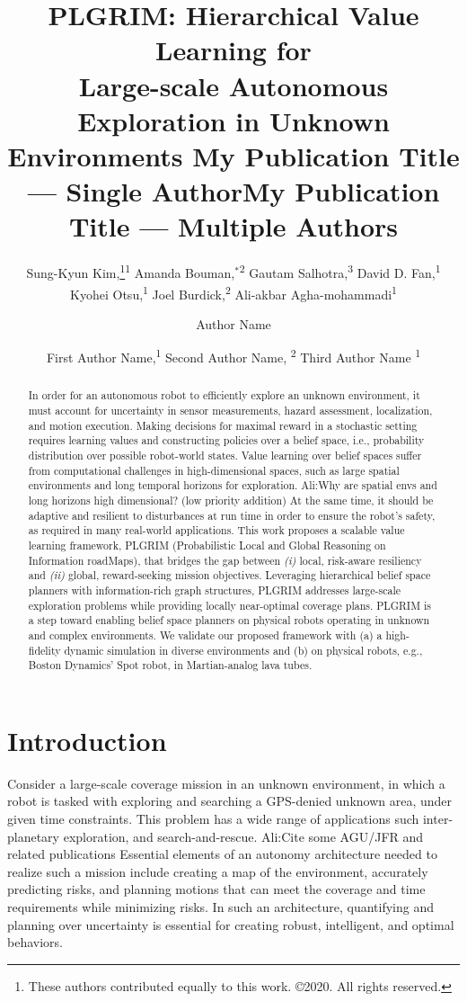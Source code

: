 \documentclass[letterpaper]{article} %
\title{
    PLGRIM: Hierarchical Value Learning for \\Large-scale Autonomous Exploration in Unknown Environments
}
\author{
		Sung-Kyun Kim,\thanks{These authors contributed equally to this work. \newline \hspace*{1.1em} \copyright2020. All rights reserved.}\textsuperscript{\rm 1}
    Amanda Bouman,$^{*}$\textsuperscript{\rm 2}
    Gautam Salhotra,\textsuperscript{\rm 3}
    David D. Fan,\textsuperscript{\rm 1} \\
    Kyohei Otsu,\textsuperscript{\rm 1}
    Joel Burdick,\textsuperscript{\rm 2}
    Ali-akbar Agha-mohammadi\textsuperscript{\rm 1} \\
}
\title{My Publication Title --- Single Author}
\author {
    Author Name \\
}
\title{My Publication Title --- Multiple Authors}
\author {
    First Author Name,\textsuperscript{\rm 1}
    Second Author Name, \textsuperscript{\rm 2}
    Third Author Name \textsuperscript{\rm 1} \\
}
\newcommand{\phdone}[1]{} %
\newcommand{\acomm}[1]{{\color{cyan}Ali:#1}} %
\begin{document}
\maketitle

\begin{abstract}
In order for an autonomous robot to efficiently explore an unknown environment, it must account for uncertainty in sensor measurements, hazard assessment, localization, and motion execution.
Making decisions for maximal reward in a stochastic setting requires learning values and constructing policies over a belief space, i.e., probability distribution over possible robot-world states.
Value learning over belief spaces suffer from computational challenges in high-dimensional spaces, such as large spatial environments and long temporal horizons for exploration. \acomm{Why are spatial envs and long horizons high dimensional? (low priority addition)}
At the same time, it should be adaptive and resilient to disturbances at run time in order to ensure the robot's safety, as required in many real-world applications.
This work proposes a scalable value learning framework, PLGRIM (Probabilistic Local and Global Reasoning on Information roadMaps), that bridges the gap between \textit{(i)} local, risk-aware resiliency and \textit{(ii)} global, reward-seeking mission objectives.  
Leveraging hierarchical belief space planners with information-rich graph structures, PLGRIM addresses large-scale exploration problems while providing locally near-optimal coverage plans. 
PLGRIM is a step toward enabling belief space planners on physical robots operating in unknown and complex environments. 
We validate our proposed framework with (a) a high-fidelity dynamic simulation in diverse environments and (b) on physical robots, e.g., Boston Dynamics' Spot robot, in Martian-analog lava tubes.
\end{abstract}


\section{Introduction}\label{sec:intro}

\phdone{High-level mission}
Consider a large-scale coverage mission in an unknown environment, in which a robot is tasked with exploring and searching a GPS-denied unknown area, under given time constraints. This problem has a wide range of applications such inter-planetary exploration, and search-and-rescue. \acomm{Cite some AGU/JFR and related publications} 
Essential elements of an autonomy architecture needed to realize such a mission include creating a map of the environment, accurately predicting risks, and planning motions that can meet the coverage and time requirements while minimizing risks.  In such an architecture, quantifying and planning over uncertainty is essential for creating robust, intelligent, and optimal behaviors.
\end{document}
